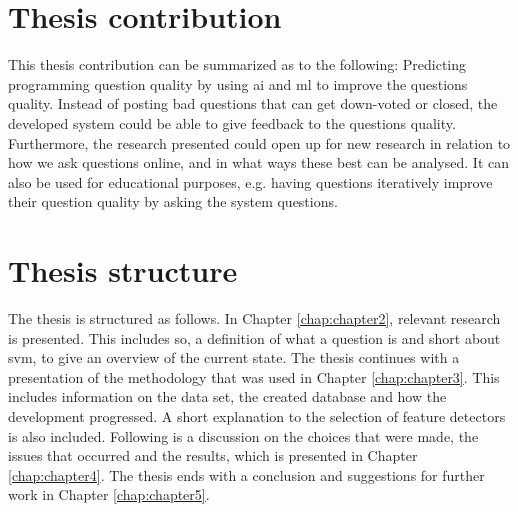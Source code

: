 \section{Thesis contribution}
\label{sec:thesis_contribution}
This thesis contribution can be summarized as to the following: 
Predicting programming question quality by  using \gls{ai} and \gls{ml} to improve the questions quality. 
Instead of posting bad questions that can get down-voted or closed, the developed system could be able to give feedback to the questions quality. 
Furthermore, the research presented could open up for new research in relation to how we ask questions online, and in what ways these best can be analysed.
It can also be used for educational purposes, e.g. having questions iteratively improve their question quality by asking the system questions.

\section{Thesis structure}
\label{sec:thesis_structure}
The thesis is structured as follows. In Chapter \ref{chap:chapter2}, relevant research is presented. 
This includes \gls{so}, a definition of what a question is and short about \gls{svm}, to give an overview of the current state. 
The thesis continues with a presentation of the methodology that was used in Chapter \ref{chap:chapter3}. 
This includes information on the data set, the created database and how the development progressed. 
A short explanation to the selection of feature detectors is also included. 
Following is a discussion on the choices that were made, the issues that occurred and the results, which is presented in Chapter \ref{chap:chapter4}.
The thesis ends with a conclusion and suggestions for further work in Chapter \ref{chap:chapter5}.
